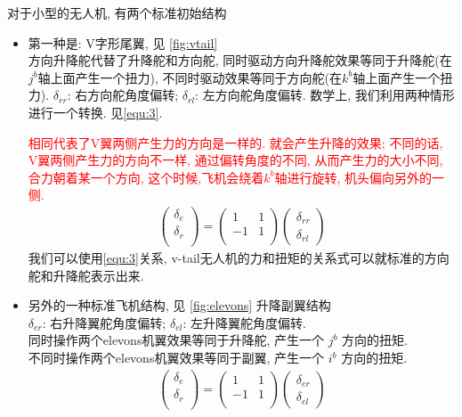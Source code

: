 \documentclass[UTF8,a4paper,10pt,nocolorlinks]{ctexart}
\begin{document}
    \par 
    \par 对于小型的无人机, 有两个标准初始结构 \par
    \begin{itemize}
      \item 第一种是: V字形尾翼, 见 \ref{fig:vtail} \\
      方向升降舵代替了升降舵和方向舵, 同时驱动方向升降舵效果等同于升降舵(在$j^{b}$轴上面产生一个扭力), 不同时驱动效果等同于方向舵(在$k^{b}$轴上面产生一个扭力). $\delta_{rr}$: 右方向舵角度偏转; $\delta_{rl}$: 左方向舵角度偏转. 
      数学上, 我们利用两种情形进行一个转换. 见\ref{equ:3}. 
      \par
      \textcolor{red}{相同代表了V翼两侧产生力的方向是一样的. 就会产生升降的效果; 不同的话, V翼两侧产生力的方向不一样, 通过偏转角度的不同, 从而产生力的大小不同, 合力朝着某一个方向, 这个时候,飞机会绕着$k^{b}$轴进行旋转, 机头偏向另外的一侧.}
      \begin{gather}
        \begin{pmatrix}
          \delta_{e} \\
          \delta_{r} \\
        \end{pmatrix} = 
        \begin{pmatrix}
          1 & 1 \\
          -1 & 1 \\
        \end{pmatrix} 
        \begin{pmatrix}
          \delta_{rr} \\
          \delta_{rl}
        \end{pmatrix}
        \label{equ:3}
      \end{gather}
      我们可以使用\ref{equ:3}关系, v-tail无人机的力和扭矩的关系式可以就标准的方向舵和升降舵表示出来.
      \item 另外的一种标准飞机结构, 见 \ref{fig:elevons} 升降副翼结构 \\
      $\delta_{er}$: 右升降翼舵角度偏转; $\delta_{el}$: 左升降翼舵角度偏转. \\
      同时操作两个elevons机翼效果等同于升降舵, 产生一个 $j^{b}$ 方向的扭矩. \\
      不同时操作两个elevons机翼效果等同于副翼, 产生一个 $i^{b}$ 方向的扭矩. \\
      \begin{gather}
        \begin{pmatrix}
          \delta_{e} \\
          \delta_{r} \\
        \end{pmatrix} = 
        \begin{pmatrix}
          1 & 1 \\
          -1 & 1 \\
        \end{pmatrix} 
        \begin{pmatrix}
          \delta_{er} \\
          \delta_{el}
        \end{pmatrix}
        \label{equ:4}
      \end{gather}
      

\end{itemize}
\end{document}
